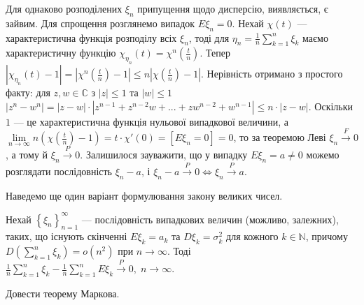 \begin{remark}
    Для однаково розподілених $\xi_n$ припущення щодо дисперсію, виявляється, є зайвим. Для спрощення розглянемо випадок $E\xi_n = 0$.
    Нехай $\chi(t)$ --- характеристична функція розподілу всіх $\xi_n$, тоді для $\eta_n = \frac{1}{n}\sum\limits_{k=1}^n \xi_k$ 
    маємо характеристичну функцію $\chi_{\eta_n} (t) = \chi^n \left(\frac{t}{n}\right)$. 
    Тепер $\left| \chi_{\eta_n} (t) - 1\right| = \left| \chi^n \left(\frac{t}{n}\right) - 1\right| \leq n \left| \chi \left(\frac{t}{n}\right) - 1\right|$.
    Нерівність отримано з простого факту: для $z, w \in \mathbb{C}$ з $|z| \leq 1$ та $|w|\leq 1$
    $\left|z^n - w^n\right| = \left|z - w\right| \cdot \left|z^{n-1} + z^{n-2}w + ... + z w^{n-2} + w^{n-1}\right| \leq n \cdot \left|z - w\right|$.
    Оскільки $1$ --- це характеристична функція нульової випадкової величини, а \\
    \noindent$ \underset{n \to \infty}{\lim} n \left(\chi(\frac{t}{n}) - 1\right) = t \cdot \chi'(0) = \left[ E\xi_n = 0\right]=0$,
    то за теоремою Леві $\xi_n \overset{F}{\longrightarrow} 0$, а тому й $\xi_n \overset{P}{\longrightarrow} 0$. Залишилося зауважити, що у випадку
    $E\xi_n = a \neq 0$ можемо розглядати послідовність $\xi_n - a$, і $\xi_n - a \overset{P}{\longrightarrow} 0 \Leftrightarrow \xi_n \overset{P}{\longrightarrow} a$. 
\end{remark}
Наведемо ще один варіант формулювання закону великих чисел.
\begin{theorem*}
    Нехай $\left\{ \xi_n\right\}_{n=1}^{\infty}$ --- послідовність випадкових величин (можливо, залежних), 
    таких, що існують скінченні $E\xi_k = a_k$ та $D\xi_k = \sigma_k^2$ для кожного $k \in \mathbb{N}$,
    причому $D \left( \sum\limits_{k=1}^n \xi_k\right) = o(n^2)$ при $n\to\infty$.
    Тоді
    $
        \frac{1}{n}\sum\limits_{k=1}^n \xi_k - \frac{1}{n}\sum\limits_{k=1}^n E\xi_k \overset{P}{\longrightarrow} 0, \; n \to \infty
    $.
\end{theorem*}
\begin{exercise}
    Довести теорему Маркова.
\end{exercise}
